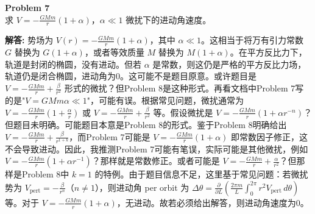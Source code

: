 \documentclass[12pt, a4paper, oneside]{ctexart}
\newenvironment{solution}{\par\noindent\textbf{解答:}\quad}{\par}
\begin{document}
\begin{mdframed}[backgroundcolor=gray!10, linewidth=0pt]
    \textbf{Problem 7} \\
    求 \(V = -\frac{GMm}{r} (1+\alpha)\)，\(\alpha \ll 1\) 微扰下的进动角速度。
\end{mdframed}
\begin{solution}
    势场为 \(V(r) = -\frac{GMm}{r} (1+\alpha)\)，其中 \(\alpha \ll 1\)。这相当于将万有引力常数 \(G\) 替换为 \(G(1+\alpha)\)，或者等效质量 \(M\) 替换为 \(M(1+\alpha)\)。在平方反比力下，轨道是封闭的椭圆，没有进动。但若 \(\alpha\) 是常数，则这仍是严格的平方反比力场，轨道仍是闭合椭圆，进动角为0。这可能不是题目原意。或许题目是 \(V = -\frac{GMm}{r} + \frac{\beta}{r^2}\) 形式的微扰？但Problem 8是这种形式。再看文档中Problem 7写的是"\(V= GMm \alpha\ll 1\)"，可能有误。根据常见问题，微扰通常为 \(V = -\frac{GMm}{r} \left(1 + \frac{\alpha}{r}\right)\) 或 \(V = -\frac{GMm}{r} + \frac{\beta}{r^2}\) 等。假设微扰是 \(V = -\frac{GMm}{r} (1 + \alpha r^{-n})\)？但题目未明确。可能题目本意是Problem 8的形式。鉴于Problem 8明确给出 \(V = -\frac{GMm}{r} + \frac{\beta}{r^{1+k}}\)，而Problem 7可能是 \(V = -\frac{GMm}{r} (1+\alpha)\) 即常数因子修正，这不会导致进动。因此，我推测Problem 7可能有笔误，实际可能是其他微扰，例如 \(V = -\frac{GMm}{r} (1 + \alpha r^{-1})\)？那样就是常数修正。或者可能是 \(V = -\frac{GMm}{r} + \frac{\alpha}{r^2}\)？但那样是Problem 8中 \(k=1\) 的特例。由于题目信息不足，这里基于常见问题：若微扰势为 \(V_{\text{pert}} = -\frac{\beta}{r^n}\)（\(n \neq 1\)），则进动角 per orbit 为 \(\Delta \theta = \frac{\partial}{\partial L} \left( \frac{2\pi m}{L} \int_0^{2\pi} r^2 V_{\text{pert}} \, d\theta \right)\) 等。对于 \(V = -\frac{GMm}{r} (1+\alpha)\)，无进动。故若必须给出解答，则进动角速度为0。
\end{solution}
\end{document}
